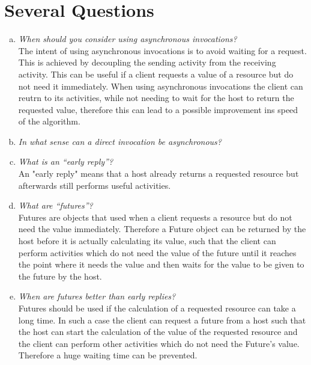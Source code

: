 \documentclass{report}
\author{Marcel \textsc{Zauder} 16-124-836 \\
	Pascal \textsc{Gerig} 16-104-721}
\begin{document}
	\section{Several Questions}
	\startsection
		\begin{enumerate}[a)]
			\item \textit{When should you consider using asynchronous invocations?} \\
			The intent of using asynchronous invocations is to avoid waiting for a request. This is achieved by decoupling the sending activity from the receiving activity. This can be useful if a client requests a value of a resource but do not need it immediately. When using asynchronous invocations the client can reutrn to its activities, while not needing to wait for the host to return the requested value, therefore this can lead to a possible improvement ins speed of the algorithm.
			\item \textit{In what sense can a direct invocation be asynchronous?} \\
			\item \textit{What is an “early reply”?} \\
			An "early reply" means that a host already returns a requested resource but afterwards still performs useful activities.
			\item \textit{What are “futures”?} \\
			Futures are objects that used when a client requests a resource but do not need the value immediately. Therefore a Future object can be returned by the host before it is actually calculating its value, such that the client can perform activities which do not need the value of the future until it reaches the point where it needs the value and then waits for the value to be given to the future by the host.
			\item \textit{When are futures better than early replies?} \\
			Futures should be used if the calculation of a requested resource can take a long time. In such a case the client can request a future from a host such that the host can start the calculation of the value of the requested resource and the client can perform other activities which do not need the Future's value. Therefore a huge waiting time can be prevented.
		\end{enumerate}
	\closesection
	
\end{document}
